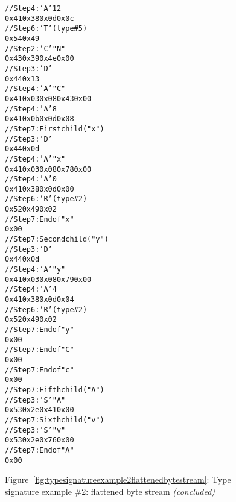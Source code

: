 \begin{figure}
\begin{dwflisting}
\begin{alltt}
    // Step 4: 'A'   12
    0x41 0x38 0x0d 0x0c
    // Step 6: 'T'  (type \#5)
    0x54 0x49
        // Step 2: 'C'  "N"
        0x43 0x39 0x4e 0x00
        // Step 3: 'D' 
        0x44 0x13
        // Step 4: 'A'   "C"
        0x41 0x03 0x08 0x43 0x00
        // Step 4: 'A'   8
        0x41 0x0b 0x0d 0x08
        // Step 7: First child ("x")
            // Step 3: 'D' 
            0x44 0x0d
            // Step 4: 'A'   "x"
            0x41 0x03 0x08 0x78 0x00
            // Step 4: 'A'   0
            0x41 0x38 0x0d 0x00
            // Step 6: 'R'  (type \#2)
            0x52 0x49 0x02
            // Step 7: End of  "x"
            0x00
        // Step 7: Second child ("y")
            // Step 3: 'D' 
            0x44 0x0d
            // Step 4: 'A'   "y"
            0x41 0x03 0x08 0x79 0x00
            // Step 4: 'A'   4
            0x41 0x38 0x0d 0x04
            // Step 6: 'R'  (type \#2)
            0x52 0x49 0x02
            // Step 7: End of  "y"
            0x00
        // Step 7: End of  "C"
        0x00
    // Step 7: End of  "c"
    0x00
// Step 7: Fifth child ("A")
    // Step 3: 'S'  "A"
    0x53 0x2e 0x41 0x00
// Step 7: Sixth child ("v")
    // Step 3: 'S'  "v"
    0x53 0x2e 0x76 0x00
// Step 7: End of  "A"
0x00
\end{alltt}
\end{dwflisting}
\begin{center}
\vspace{2mm}
Figure~\ref{fig:typesignatureexample2flattenedbytestream}: Type signature example \#2: flattened byte stream \textit{(concluded)}
\end{center}
\end{figure}

